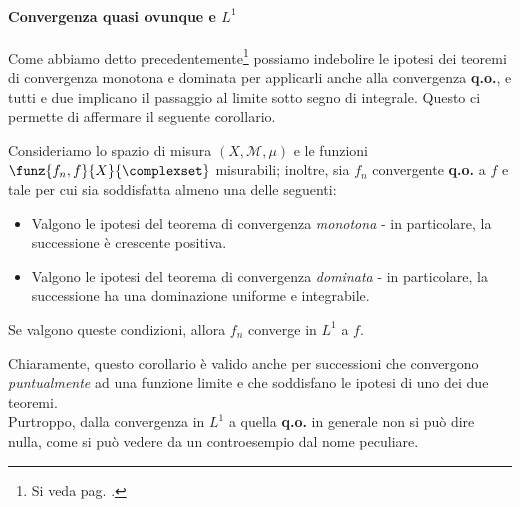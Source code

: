\paragraph{Convergenza quasi ovunque e {$L^1$}}
Come abbiamo detto precedentemente\footnote{Si veda pag. \pageref{indebolimentoteoremi}.} possiamo indebolire le ipotesi dei teoremi di convergenza monotona e dominata per applicarli anche alla convergenza \textbf{q.o.}, e tutti e due implicano il passaggio al limite sotto segno di integrale. Questo ci permette di affermare il seguente corollario.
\begin{corollaryqed}
	Consideriamo lo spazio di misura $\left(X,\mathcal{M},\mu\right)$ e le funzioni $\funz{f_n,f}{X}{\complexset}$ misurabili; inoltre, sia $f_n$ convergente \textbf{q.o.} a $f$ e tale per cui sia soddisfatta almeno una delle seguenti:
	\begin{itemize}
		 \item Valgono le ipotesi del teorema di convergenza \textit{monotona} - in particolare, la successione è crescente positiva.
		 \item Valgono le ipotesi del teorema di convergenza \textit{dominata} - in particolare, la successione ha una dominazione uniforme e integrabile.
	\end{itemize}
	Se valgono queste condizioni, allora $f_n$ converge in $L^1$ a $f$.
\end{corollaryqed}
Chiaramente, questo corollario è valido anche per successioni che convergono \textit{puntualmente} ad una funzione limite e che soddisfano le ipotesi di uno dei due teoremi.\\
Purtroppo, dalla convergenza in $L^1$ a quella \textbf{q.o.} in generale non si può dire nulla, come si può vedere da un controesempio dal nome peculiare.
